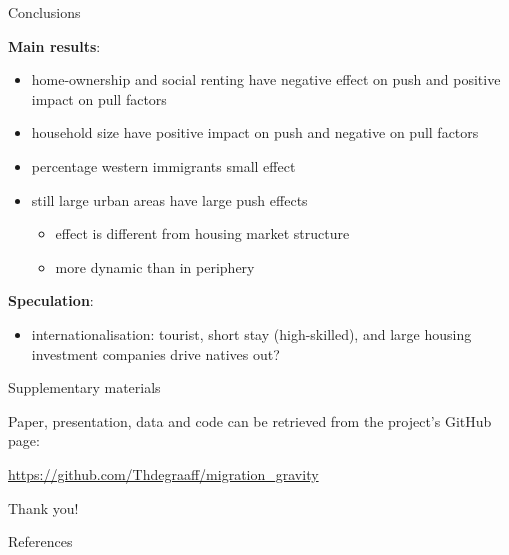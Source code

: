 \documentclass{beamer}
\begin{document}
\begin{frame}{Conclusions}

\textbf{Main results}:
\begin{itemize}
  \item home-ownership and social renting have \alert{negative} effect on push and \alert{positive} impact on pull factors
  \item household size have \alert{positive} impact on push and \alert{negative} on pull factors
  \item percentage western immigrants small effect
  \item \alert{still} large urban areas have large \alert{push} effects
  \begin{itemize}
	\item effect is different from housing market structure 
	\item more \alert{dynamic} than in periphery
  \end{itemize}
\end{itemize}

\textbf{Speculation}:
\begin{itemize}
 \item \alert{internationalisation}: tourist, short stay (high-skilled), and large housing investment companies drive natives out?
\end{itemize}
\end{frame}

\begin{frame}{Supplementary materials}

Paper, presentation, data and code can be retrieved from the project's GitHub page: 

\begin{center}\url{https://github.com/Thdegraaff/migration\_gravity}\end{center}

\end{frame}

\begin{frame}[standout]
Thank you!
\end{frame}

\appendix

\begin{frame}[allowframebreaks]{References}

		\printbibliography[heading=none]

\end{frame}
\end{document}

